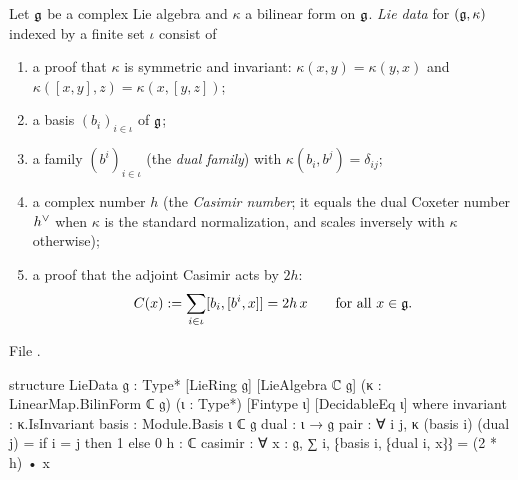\begin{definition}\label{l23:def:liedata}
Let $\mathfrak g$ be a complex Lie algebra and $\kappa$ a bilinear form on $\mathfrak g$. \emph{Lie data} for
$(\mathfrak g,\kappa)$ indexed by a finite set $\iota$ consist of
\begin{enumerate}
\item a proof that $\kappa$ is symmetric and invariant: $\kappa(x,y)=\kappa(y,x)$ and $\kappa([x,y],z)=\kappa(x,[y,z])$;
\item a basis $(b_i)_{i\in\iota}$ of $\mathfrak g$;
\item a family $(b^i)_{i\in\iota}$ (the \emph{dual family}) with $\kappa(b_i,b^j)=\delta_{ij}$;
\item a complex number $h$ (the \emph{Casimir number}; it equals the dual Coxeter number $h^\vee$ when $\kappa$ is the
  standard normalization, and scales inversely with $\kappa$ otherwise);
\item a proof that the adjoint Casimir acts by $2h$:
\begin{equation}\label{l23:eq:cas}
C(x):=\sum_{i\in\iota}[b_i,[b^i,x]]=2h\,x\qquad\text{for all }x\in\mathfrak g .
\end{equation}
\end{enumerate}
\end{definition}
\noindent File .
\begin{leancode}
structure LieData {𝔤 : Type*} [LieRing 𝔤] [LieAlgebra ℂ 𝔤]
    (κ : LinearMap.BilinForm ℂ 𝔤) (ι : Type*) [Fintype ι] [DecidableEq ι] where
  invariant : κ.IsInvariant
  basis : Module.Basis ι ℂ 𝔤
  dual : ι → 𝔤
  pair : ∀ i j, κ (basis i) (dual j) = if i = j then 1 else 0
  h : ℂ
  casimir : ∀ x : 𝔤, ∑ i, ⁅basis i, ⁅dual i, x⁆⁆ = (2 * h) • x
\end{leancode}

